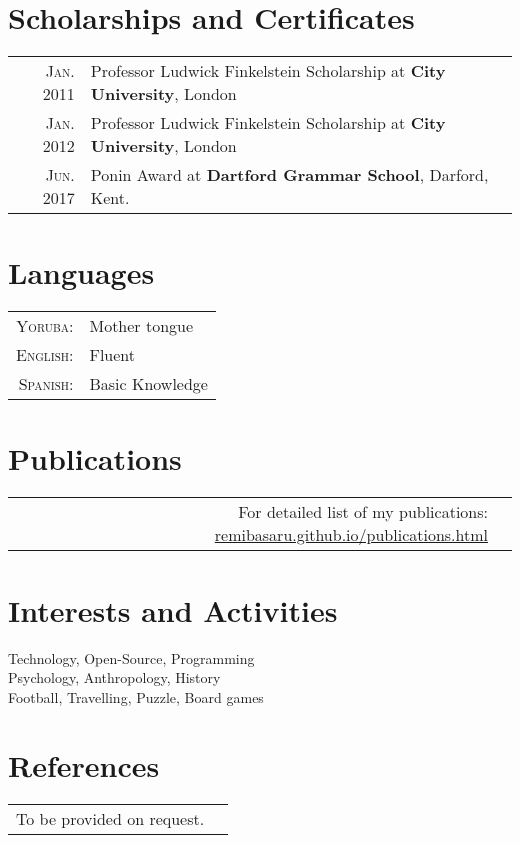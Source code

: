\documentclass[letterpaper,11pt]{article}
\begin{document}
\section{Scholarships and Certificates}
\begin{tabular}{rl}
 \textsc{Jan.} 2011 & Professor Ludwick Finkelstein Scholarship at \textbf{City University}, London\\
\textsc{Jan.} 2012 & Professor Ludwick Finkelstein Scholarship at \textbf{City University}, London\\
\textsc{Jun.} 2017 & Ponin Award at \textbf{Dartford Grammar School}, Darford, Kent.
\end{tabular}


\section{Languages}
\begin{tabular}{rl}
 \textsc{Yoruba:}&Mother tongue\\
\textsc{English:}&Fluent\\
\textsc{Spanish:}&Basic Knowledge\\
\end{tabular}

\section{Publications}
\begin{tabular}{rp{12cm}}
\normalsize \textsc{ } \hfill \footnotesize For detailed list of my publications: \href{remibasaru.github.io/publications.html}{remibasaru.github.io/publications.html}\\
\end{tabular}



\section{Interests and Activities}
\hspace{0.4cm} Technology, Open-Source, Programming\\
\hspace{0.4cm} Psychology, Anthropology, History\\
\hspace{0.4cm} Football, Travelling, Puzzle, Board games



\section{References}
\begin{tabular}{rp{12cm}}
\normalsize \textsc{ } \hfill \footnotesize To be provided on request.\\
\end{tabular}
\end{document}
